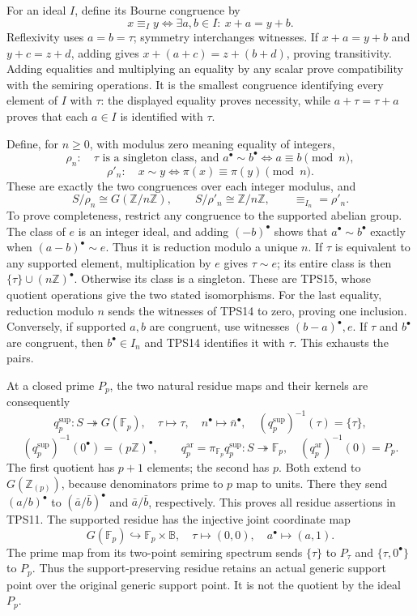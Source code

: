\documentclass[
  10pt,
]{article}
\begin{document}
For an ideal \(I\), define its Bourne congruence by \[
x\equiv_I y\iff\exists a,b\in I:\ x+a=y+b.
\tag{TPS14}
\] Reflexivity uses \(a=b=\tau\); symmetry interchanges witnesses. If
\(x+a=y+b\) and \(y+c=z+d\), adding gives \(x+(a+c)=z+(b+d)\), proving
transitivity. Adding equalities and multiplying an equality by any
scalar prove compatibility with the semiring operations. It is the
smallest congruence identifying every element of \(I\) with \(\tau\):
the displayed equality proves necessity, while \(a+\tau=\tau+a\) proves
that each \(a\in I\) is identified with \(\tau\).

Define, for \(n\ge0\), with modulus zero meaning equality of integers,
\[
\rho_n:\quad \tau\text{ is a singleton class, and }a^\bullet\sim b^\bullet
\iff a\equiv b\pmod n,
\] \[
\rho'_n:\quad x\sim y\iff\pi(x)\equiv\pi(y)\pmod n.
\tag{TPS15}
\] These are exactly the two congruences over each integer modulus, and
\[
S/\rho_n\cong G(\mathbb Z/n\mathbb Z),\qquad
S/\rho'_n\cong\mathbb Z/n\mathbb Z,
\qquad \equiv_{I_n}=\rho'_n.
\tag{TPS16}
\] To prove completeness, restrict any congruence to the supported
abelian group. The class of \(e\) is an integer ideal, and adding
\((-b)^\bullet\) shows that \(a^\bullet\sim b^\bullet\) exactly when
\((a-b)^\bullet\sim e\). Thus it is reduction modulo a unique \(n\). If
\(\tau\) is equivalent to any supported element, multiplication by \(e\)
gives \(\tau\sim e\); its entire class is then
\(\{\tau\}\cup(n\mathbb Z)^\bullet\). Otherwise its class is a
singleton. These are TPS15, whose quotient operations give the two
stated isomorphisms. For the last equality, reduction modulo \(n\) sends
the witnesses of TPS14 to zero, proving one inclusion. Conversely, if
supported \(a,b\) are congruent, use witnesses \((b-a)^\bullet,e\). If
\(\tau\) and \(b^\bullet\) are congruent, then \(b^\bullet\in I_n\) and
TPS14 identifies it with \(\tau\). This exhausts the pairs.

At a closed prime \(P_p\), the two natural residue maps and their
kernels are consequently \[
q_p^{\mathrm{sup}}:S\twoheadrightarrow G(\mathbb F_p),
\quad \tau\mapsto\tau,\quad n^\bullet\mapsto\bar n^\bullet,
\quad (q_p^{\mathrm{sup}})^{-1}(\tau)=\{\tau\},
\] \[
(q_p^{\mathrm{sup}})^{-1}(0^\bullet)=(p\mathbb Z)^\bullet,
\qquad
q_p^{\mathrm{ar}}=\pi_{\mathbb F_p}q_p^{\mathrm{sup}}:S\twoheadrightarrow\mathbb F_p,
\quad (q_p^{\mathrm{ar}})^{-1}(0)=P_p.
\tag{TPS17}
\] The first quotient has \(p+1\) elements; the second has \(p\). Both
extend to \(G(\mathbb Z_{(p)})\), because denominators prime to \(p\)
map to units. There they send \((a/b)^\bullet\) to
\((\bar a/\bar b)^\bullet\) and \(\bar a/\bar b\), respectively. This
proves all residue assertions in TPS11. The supported residue has the
injective joint coordinate map \[
G(\mathbb F_p)\hookrightarrow\mathbb F_p\times\mathbb B,
\quad \tau\mapsto(0,0),\quad a^\bullet\mapsto(a,1).
\tag{TPS18}
\] The prime map from its two-point semiring spectrum sends \(\{\tau\}\)
to \(P_\tau\) and \(\{\tau,0^\bullet\}\) to \(P_p\). Thus the
support-preserving residue retains an actual generic support point over
the original generic support point. It is not the quotient by the ideal
\(P_p\).
\end{document}
